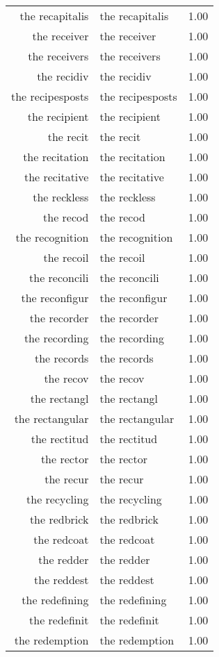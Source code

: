 \begin{table}[ht]
\begin{tabular}{rlr}
  the recapitalis & the recapitalis & 1.00 \\ 
  the receiver & the receiver & 1.00 \\ 
  the receivers & the receivers & 1.00 \\ 
  the recidiv & the recidiv & 1.00 \\ 
  the recipesposts & the recipesposts & 1.00 \\ 
  the recipient & the recipient & 1.00 \\ 
  the recit & the recit & 1.00 \\ 
  the recitation & the recitation & 1.00 \\ 
  the recitative & the recitative & 1.00 \\ 
  the reckless & the reckless & 1.00 \\ 
  the recod & the recod & 1.00 \\ 
  the recognition & the recognition & 1.00 \\ 
  the recoil & the recoil & 1.00 \\ 
  the reconcili & the reconcili & 1.00 \\ 
  the reconfigur & the reconfigur & 1.00 \\ 
  the recorder & the recorder & 1.00 \\ 
  the recording & the recording & 1.00 \\ 
  the records & the records & 1.00 \\ 
  the recov & the recov & 1.00 \\ 
  the rectangl & the rectangl & 1.00 \\ 
  the rectangular & the rectangular & 1.00 \\ 
  the rectitud & the rectitud & 1.00 \\ 
  the rector & the rector & 1.00 \\ 
  the recur & the recur & 1.00 \\ 
  the recycling & the recycling & 1.00 \\ 
  the redbrick & the redbrick & 1.00 \\ 
  the redcoat & the redcoat & 1.00 \\ 
  the redder & the redder & 1.00 \\ 
  the reddest & the reddest & 1.00 \\ 
  the redefining & the redefining & 1.00 \\ 
  the redefinit & the redefinit & 1.00 \\ 
  the redemption & the redemption & 1.00 \\ 

\end{tabular}
\end{table}

